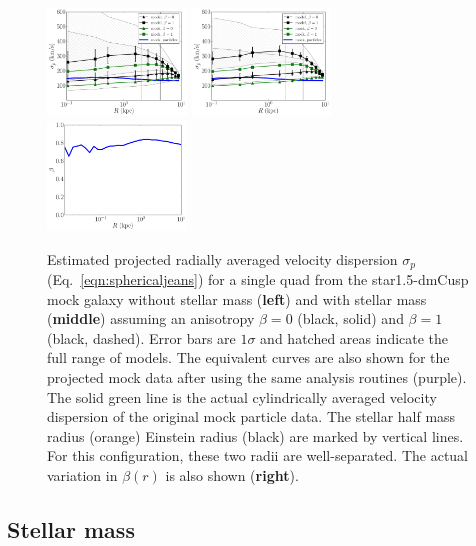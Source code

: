 \documentclass[galley,usenatbib]{mn2e}
\newcommand{\eqnrefp}[1] {(Eq.~\ref{#1})}
\newcommand{\mockBC}{{\sc star1.5-dmCusp}}
\begin{document}
\begin{figure}
\includegraphics[width=0.33\textwidth]{BCQuadR1a_Tms_sigp-1.pdf}
\includegraphics[width=0.33\textwidth]{BCQuadR1a_TmS_sigp-2.pdf}
\includegraphics[width=0.33\textwidth]{BC_beta.pdf}
\caption{ Estimated projected radially averaged velocity dispersion $\sigma_p$
\eqnrefp{eqn:sphericaljeans} for a single quad from the \mockBC{} mock galaxy
without stellar mass (\textbf{left}) and with stellar mass (\textbf{middle})
assuming an anisotropy $\beta=0$ (black, solid) and $\beta=1$ (black, dashed).
Error bars are $1\sigma$ and hatched areas indicate the full range of models.
The equivalent curves are also shown for the projected mock data after using
the same analysis routines (purple). The solid green line is the actual
cylindrically averaged velocity dispersion of the original mock particle data.
The stellar half mass radius (orange) Einstein radius (black) are marked by
vertical lines. For this configuration, these two radii are well-separated. The
actual variation in $\beta(r)$ is also shown (\textbf{right}).}
\label{fig:sigp} \end{figure}
\subsection{Stellar mass}
\label{stellar mass}
\end{document}
